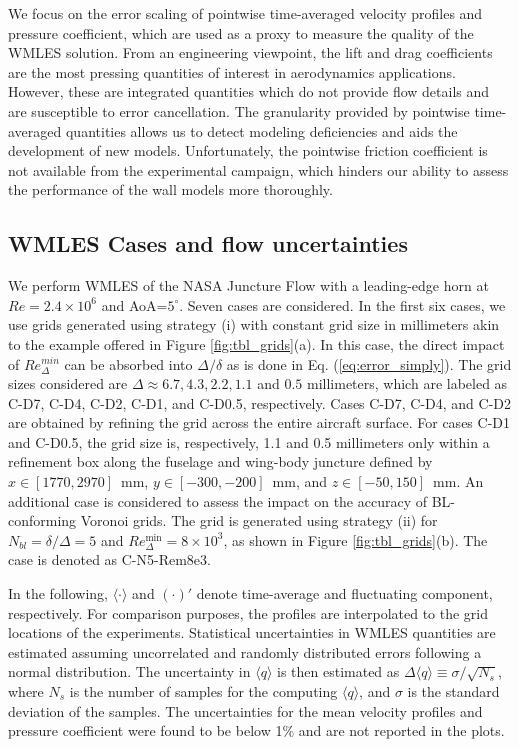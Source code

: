 \documentclass{ctr}
\begin{document}
We focus on the error scaling of pointwise time-averaged velocity
profiles and pressure coefficient, which are used as a proxy to
measure the quality of the WMLES solution.  From an engineering
viewpoint, the lift and drag coefficients are the most pressing
quantities of interest in aerodynamics applications. However, these
are integrated quantities which do not provide flow details and are
susceptible to error cancellation.  The granularity provided by
pointwise time-averaged quantities allows us to detect modeling
deficiencies and aids the development of new models. Unfortunately,
the pointwise friction coefficient is not available from the
experimental campaign, which hinders our ability to assess the
performance of the wall models more thoroughly.

\subsection{WMLES Cases and flow uncertainties}\label{Cases}

We perform WMLES of the NASA Juncture Flow with a leading-edge horn at
$Re=2.4 \times 10^6$ and AoA=$5^\circ$.  Seven cases are
considered. In the first six cases, we use grids generated using
strategy (i) with constant grid size in millimeters akin to the example
offered in Figure \ref{fig:tbl_grids}(a). In this case, the direct
impact of $Re_\Delta^{min}$ can be absorbed into $\Delta/\delta$ as is
done in Eq. (\ref{eq:error_simply}). The grid sizes considered are
$\Delta \approx 6.7, 4.3, 2.2, 1.1$ and $0.5$ millimeters, which are
labeled as C-D7, C-D4, C-D2, C-D1, and C-D0.5, respectively. Cases
C-D7, C-D4, and C-D2 are obtained by refining the grid across the
entire aircraft surface. For cases C-D1 and C-D0.5, the grid size is,
respectively, 1.1 and 0.5 millimeters only within a refinement box
along the fuselage and wing-body juncture defined by
$x\in[1770,2970]$~mm, $y\in[-300,-200]$~mm, and $z\in[-50,150]$~mm. An
additional case is considered to assess the impact on the accuracy of
BL-conforming Voronoi grids. The grid is generated using
strategy (ii) for $N_{bl} = \delta/\Delta = 5$ and
$Re_\Delta^\mathrm{min}=8\times 10^3$, as shown in Figure
\ref{fig:tbl_grids}(b). The case is denoted as C-N5-Rem8e3.

In the following, $\langle \cdot \rangle$ and $(\cdot)'$ denote
time-average and fluctuating component, respectively. For comparison
purposes, the profiles are interpolated to the grid locations of the
experiments. Statistical uncertainties in WMLES quantities are
estimated assuming uncorrelated and randomly distributed errors
following a normal distribution.  The uncertainty in $\langle q
\rangle$ is then estimated as $\Delta \langle q \rangle \equiv
\sigma/\sqrt{N_s}$, where $N_s$ is the number of samples for the
computing $\langle q \rangle$, and $\sigma$ is the standard deviation
of the samples.  The uncertainties for the mean velocity profiles and
pressure coefficient were found to be below 1\% and are not reported
in the plots.
\end{document}
